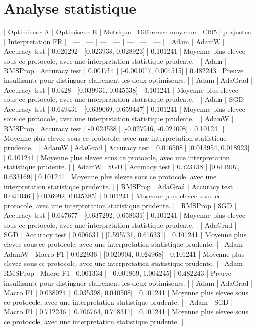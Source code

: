 \documentclass[11pt,a4paper]{article}
\begin{document}
\section{Analyse statistique}
\par
| Optimiseur A | Optimiseur B | Metrique | Difference moyenne | CI95 | p ajustee | Interpretation FR |
| --- | --- | --- | --- | --- | --- | --- |
| Adam | AdamW | Accuracy test | 0.026292 | [0.023938, 0.028923] | 0.101241 | Moyenne plus elevee sous ce protocole, avec une interpretation statistique prudente. |
| Adam | RMSProp | Accuracy test | 0.001754 | [-0.001077, 0.004515] | 0.482243 | Preuve insuffisante pour distinguer clairement les deux optimiseurs. |
| Adam | AdaGrad | Accuracy test | 0.0428 | [0.039931, 0.045538] | 0.101241 | Moyenne plus elevee sous ce protocole, avec une interpretation statistique prudente. |
| Adam | SGD | Accuracy test | 0.649431 | [0.639069, 0.659447] | 0.101241 | Moyenne plus elevee sous ce protocole, avec une interpretation statistique prudente. |
| AdamW | RMSProp | Accuracy test | -0.024538 | [-0.027946, -0.021008] | 0.101241 | Moyenne plus elevee sous ce protocole, avec une interpretation statistique prudente. |
| AdamW | AdaGrad | Accuracy test | 0.016508 | [0.013954, 0.018923] | 0.101241 | Moyenne plus elevee sous ce protocole, avec une interpretation statistique prudente. |
| AdamW | SGD | Accuracy test | 0.623138 | [0.611907, 0.633169] | 0.101241 | Moyenne plus elevee sous ce protocole, avec une interpretation statistique prudente. |
| RMSProp | AdaGrad | Accuracy test | 0.041046 | [0.036992, 0.045385] | 0.101241 | Moyenne plus elevee sous ce protocole, avec une interpretation statistique prudente. |
| RMSProp | SGD | Accuracy test | 0.647677 | [0.637292, 0.658631] | 0.101241 | Moyenne plus elevee sous ce protocole, avec une interpretation statistique prudente. |
| AdaGrad | SGD | Accuracy test | 0.606631 | [0.595731, 0.616331] | 0.101241 | Moyenne plus elevee sous ce protocole, avec une interpretation statistique prudente. |
| Adam | AdamW | Macro F1 | 0.022936 | [0.020904, 0.024968] | 0.101241 | Moyenne plus elevee sous ce protocole, avec une interpretation statistique prudente. |
| Adam | RMSProp | Macro F1 | 0.001334 | [-0.001869, 0.004245] | 0.482243 | Preuve insuffisante pour distinguer clairement les deux optimiseurs. |
| Adam | AdaGrad | Macro F1 | 0.038024 | [0.035398, 0.040508] | 0.101241 | Moyenne plus elevee sous ce protocole, avec une interpretation statistique prudente. |
| Adam | SGD | Macro F1 | 0.712246 | [0.706764, 0.718311] | 0.101241 | Moyenne plus elevee sous ce protocole, avec une interpretation statistique prudente. |
\end{document}
